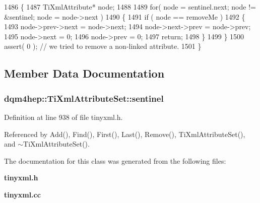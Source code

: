 \begin{DoxyCode}
1486 \{
1487   TiXmlAttribute* node;
1488 
1489   \textcolor{keywordflow}{for}( node = sentinel.next; node != &sentinel; node = node->next )
1490   \{
1491     \textcolor{keywordflow}{if} ( node == removeMe )
1492     \{
1493       node->prev->next = node->next;
1494       node->next->prev = node->prev;
1495       node->next = 0;
1496       node->prev = 0;
1497       \textcolor{keywordflow}{return};
1498     \}
1499   \}
1500   assert( 0 );    \textcolor{comment}{// we tried to remove a non-linked attribute.}
1501 \}
\end{DoxyCode}


\subsection{Member Data Documentation}
\subsubsection[{sentinel}]{ dqm4hep\+::\+Ti\+Xml\+Attribute\+Set\+::sentinel\hspace{0.3cm}{\ttfamily [private]}}\label{classdqm4hep_1_1TiXmlAttributeSet_a409fd22576e0d295abf10434c5ce6622}


Definition at line 938 of file tinyxml.\+h.



Referenced by Add(), Find(), First(), Last(), Remove(), Ti\+Xml\+Attribute\+Set(), and $\sim$\+Ti\+Xml\+Attribute\+Set().



The documentation for this class was generated from the following files\+:\begin{DoxyCompactItemize}
\item 
{\bf tinyxml.\+h}\item 
{\bf tinyxml.\+cc}\end{DoxyCompactItemize}
